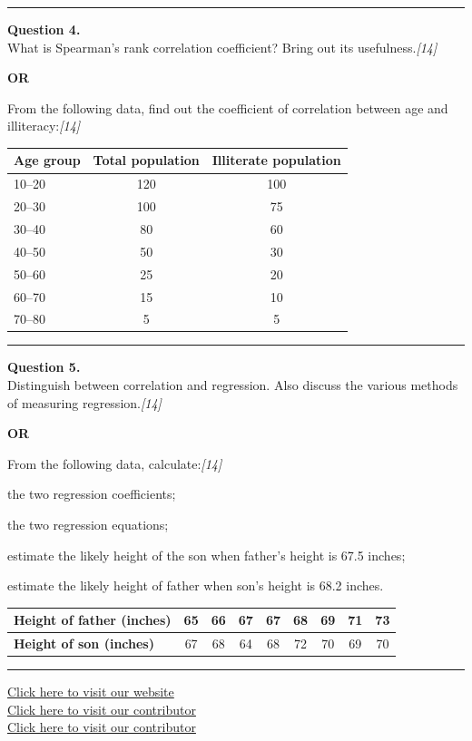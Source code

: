 \documentclass[11pt,a4paper]{article}
\newcommand{\pts}[1]{\hfill   \textit{[#1]}}
\begin{document}
\medskip\rule{\linewidth}{0.2pt}




\noindent   \textbf{Question 4.} \\
What is Spearman's rank correlation coefficient? Bring out its usefulness.\pts{14}

\centerline{   \textbf{OR}}

From the following data, find out the coefficient of correlation between age and illiteracy:\pts{14}

\begin{center}
\renewcommand{\arraystretch}{1.2}

\begin{tabular}{|l|c|c|}
\hline
   \textbf{Age group} &   \textbf{Total population} &   \textbf{Illiterate population} \\ \hline
10--20 & 120 & 100 \\
20--30 & 100 & 75 \\
30--40 & 80 & 60 \\
40--50 & 50 & 30 \\
50--60 & 25 & 20 \\
60--70 & 15 & 10 \\
70--80 & 5 & 5 \\ \hline
\end{tabular}
\end{center}

\medskip\rule{\linewidth}{0.2pt}




\noindent   \textbf{Question 5.} \\
Distinguish between correlation and regression. Also discuss the various methods of measuring regression.\pts{14}

\centerline{   \textbf{OR}}

From the following data, calculate:\pts{14}

\begin{parts}
  \item the two regression coefficients;
  \item the two regression equations;
  \item estimate the likely height of the son when father's height is 67.5 inches;
  \item estimate the likely height of father when son's height is 68.2 inches.
\end{parts}

\begin{center}
\renewcommand{\arraystretch}{1.2}

\begin{tabular}{|l|c|c|c|c|c|c|c|c|}
\hline
   \textbf{Height of father (inches)} & 65 & 66 & 67 & 67 & 68 & 69 & 71 & 73 \\ \hline
   \textbf{Height of son (inches)} & 67 & 68 & 64 & 68 & 72 & 70 & 69 & 70 \\ \hline
\end{tabular}
\end{center}

\vfill
\rule{\linewidth}{0.4pt}

\begin{center}\small
\href{https://bhu-exam.vercel.app/}{Click here to visit our website}\\[4pt]
\href{https://me-aryan.vercel.app/}{Click here to visit our contributor}\\[4pt]
\href{https://quashan-me.vercel.app/}{Click here to visit our contributor}
\end{center}
\end{document}
